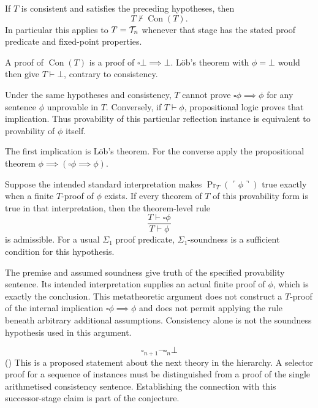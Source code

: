 \begin{corollary}
If $T$ is consistent and satisfies the preceding hypotheses, then
\[
T\nvdash\operatorname{Con}(T).
\]
In particular this applies to $T=\mathcal{T}_n$ whenever that stage has the
stated proof predicate and fixed-point properties.
\end{corollary}
\Proof
A proof of $\operatorname{Con}(T)$ is a proof of
$\square\bot\implies\bot$. L\"ob's theorem with $\phi=\bot$ would
then give $T\vdash\bot$, contrary to consistency.
\Done

\begin{corollary}
Under the same hypotheses and consistency, $T$ cannot prove
$\square\phi\implies\phi$ for any sentence $\phi$ unprovable in $T$.
Conversely, if $T\vdash\phi$, propositional logic proves that implication.
Thus provability of this particular reflection instance is equivalent to
provability of $\phi$ itself.
\end{corollary}
\Proof
The first implication is L\"ob's theorem. For the converse apply the
propositional theorem $\phi\implies(\square\phi\implies\phi)$.
\Done

\begin{proposition}
Suppose the intended standard interpretation makes
$\operatorname{Pr}_T(\ulcorner\phi\urcorner)$ true exactly when a finite
$T$-proof of $\phi$ exists. If every theorem of $T$ of this provability
form is true in that interpretation, then the theorem-level rule
\[
\frac{T\vdash\square\phi}{T\vdash\phi}
\]
is admissible. For a usual $\Sigma_1$ proof predicate, $\Sigma_1$-soundness
is a sufficient condition for this hypothesis.
\end{proposition}
\Proof
The premise and assumed soundness give truth of the specified provability
sentence. Its intended interpretation supplies an actual finite proof of
$\phi$, which is exactly the conclusion. This metatheoretic argument
does not construct a $T$-proof of the internal implication
$\square\phi\implies\phi$ and does not permit applying the rule beneath
arbitrary additional assumptions. Consistency alone is not the soundness
hypothesis used in this argument.
\Done

\begin{conjecture}
\[
\square_{n+1}\neg\square_n\bot
\]
(\cite{artemov2024serialpropertiesselectorproofs})
This is a proposed statement about the next theory in the hierarchy.
A selector proof for a sequence of instances must be distinguished from a
proof of the single arithmetised consistency sentence. Establishing the
connection with this successor-stage claim is part of the conjecture.
\end{conjecture}

